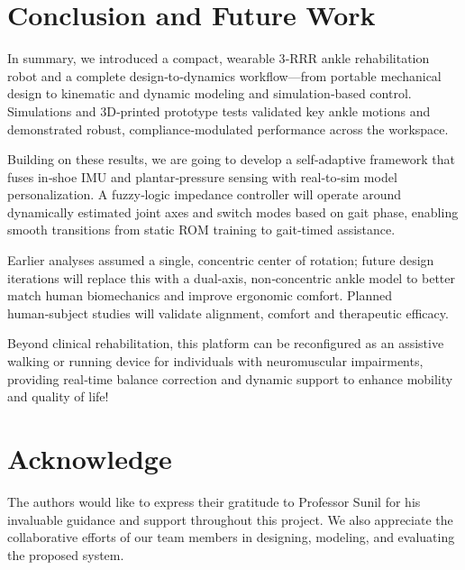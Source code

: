 \documentclass[letterpaper, 10 pt, conference]{ieeeconf}  %
\begin{document}
\section{Conclusion and Future Work}

In summary, we introduced a compact, wearable 3‑RRR ankle rehabilitation robot and a complete design‑to‑dynamics workflow—from portable mechanical design to kinematic and dynamic modeling and simulation‑based control. Simulations and 3D‑printed prototype tests validated key ankle motions and demonstrated robust, compliance‑modulated performance across the workspace.

Building on these results, we are going to develop a self‑adaptive framework that fuses in‑shoe IMU and plantar‑pressure sensing with real‑to‑sim model personalization. A fuzzy‑logic impedance controller will operate around dynamically estimated joint axes and switch modes based on gait phase, enabling smooth transitions from static ROM training to gait‑timed assistance.

Earlier analyses assumed a single, concentric center of rotation; future design iterations will replace this with a dual‑axis, non‑concentric ankle model to better match human biomechanics and improve ergonomic comfort. Planned human‑subject studies will validate alignment, comfort and therapeutic efficacy.

Beyond clinical rehabilitation, this platform can be reconfigured as an assistive walking or running device for individuals with neuromuscular impairments, providing real‑time balance correction and dynamic support to enhance mobility and quality of life!

\section*{Acknowledge}

The authors would like to express their gratitude to Professor Sunil for his invaluable guidance and support throughout this project. We also appreciate the collaborative efforts of our team members in designing, modeling, and evaluating the proposed system.
\end{document}
